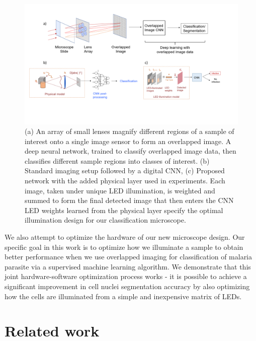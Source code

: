 \documentclass{article}
\begin{document}
\begin{figure}
\centering
\includegraphics[width=\linewidth]{590L2.pdf}
\caption{(a) An array of small lenses magnify different regions of a sample of interest onto a single image sensor to form an overlapped image. A deep neural network, trained to classify overlapped image data, then classifies different sample regions into classes of interest. (b) Standard imaging setup followed by a digital CNN, (c) Proposed network with the added physical layer used in experiments. Each image, taken under unique LED illumination, is weighted and summed to form the final detected image that then enters the CNN LED weights learned from the physical layer specify the optimal illumination design for our classification microscope.}
\label{simsetup}
\end{figure}


We also attempt to optimize the hardware of our new microscope design. Our specific goal in this work is to optimize how we illuminate a sample to obtain better performance when we use overlapped imaging for classification of malaria parasite via a supervised machine learning algorithm. We demonstrate that this joint hardware-software optimization process works - it is possible to achieve a significant improvement in cell nuclei segmentation accuracy by also optimizing how the cells are illuminated from a simple and inexpensive matrix of LEDs.

\section{Related work}
\end{document}
